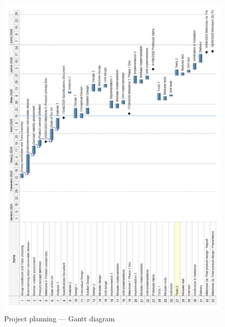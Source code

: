 %
%
\begin{figure}[!htbp]
   \centering
       \includegraphics[page=1,width=1.0\textwidth]{sec/pdf/gantt-diag-orig.pdf} 
 \caption{Project planning --- Gantt diagram}%
\label{fig:gantt-diag-orig}
\end{figure}
% 
